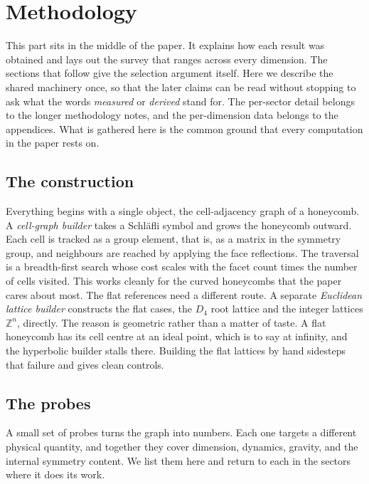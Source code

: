 \section{Methodology}

This part sits in the middle of the paper. It explains how each result was obtained and lays out the survey that
ranges across every dimension. The sections that follow give the selection argument itself. Here we describe the
shared machinery once, so that the later claims can be read without stopping to ask what the words
\emph{measured} or \emph{derived} stand for. The per-sector detail belongs to the longer methodology notes, and
the per-dimension data belongs to the appendices. What is gathered here is the common ground that every
computation in the paper rests on.

\subsection{The construction}

Everything begins with a single object, the cell-adjacency graph of a honeycomb. A \emph{cell-graph builder}
takes a Schl\"afli symbol and grows the honeycomb outward. Each cell is tracked as a group element, that is, as a
matrix in the symmetry group, and neighbours are reached by applying the face reflections. The traversal is a
breadth-first search whose cost scales with the facet count times the number of cells visited. This works
cleanly for the curved honeycombs that the paper cares about most. The flat references need a different route.
A separate \emph{Euclidean lattice builder} constructs the flat cases, the $D_4$ root lattice and the integer
lattices $\mathbb{Z}^n$, directly. The reason is geometric rather than a matter of taste. A flat honeycomb has
its cell centre at an ideal point, which is to say at infinity, and the hyperbolic builder stalls there. Building
the flat lattices by hand sidesteps that failure and gives clean controls.

\subsection{The probes}

A small set of probes turns the graph into numbers. Each one targets a different physical quantity, and together
they cover dimension, dynamics, gravity, and the internal symmetry content. We list them here and return to each
in the sectors where it does its work.

